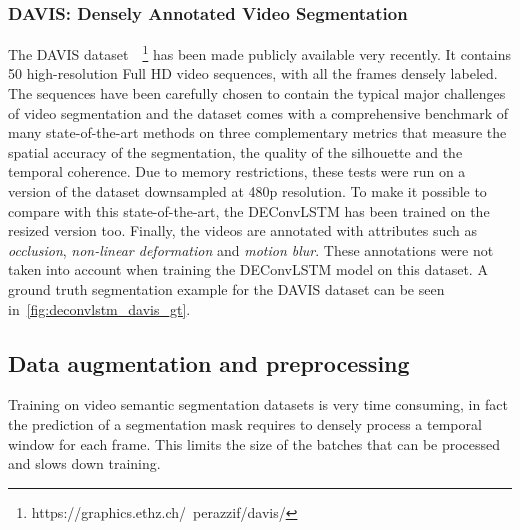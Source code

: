 \subsubsection{DAVIS: Densely Annotated Video Segmentation}
\label{sec:deconvLSTM_davis}
The DAVIS dataset~\citep{Perazzi2016}~\footnote{
https://graphics.ethz.ch/~perazzif/davis/} has been made publicly available
very recently. It contains 50 high-resolution Full HD video sequences, with
all the frames densely labeled. The sequences have been carefully chosen to
contain the typical major challenges of video segmentation and the dataset
comes with a comprehensive benchmark of many state-of-the-art methods on
three complementary metrics that measure the spatial accuracy of the
segmentation, the quality of the silhouette and the temporal coherence. Due to
memory restrictions, these tests were run on a version of the dataset
downsampled at 480p resolution. To make it possible to compare with this
state-of-the-art, the DEConvLSTM has been trained on the resized version too.
Finally, the videos are annotated with attributes such as \textit{occlusion},
\textit{non-linear deformation} and \textit{motion blur}. These annotations
were not taken into account when training the DEConvLSTM model on this dataset.
A ground truth segmentation example for the DAVIS dataset can be seen
in~\autoref{fig:deconvlstm_davis_gt}.



\subsection{Data augmentation and preprocessing}
Training on video semantic segmentation datasets is very time consuming, in
fact the prediction of a segmentation mask requires to densely process a
temporal window for each frame. This limits the size of the batches that can
be processed and slows down training.

